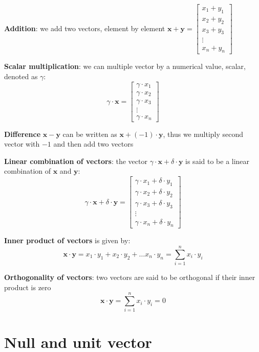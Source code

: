 \documentclass[
]{book}
\theoremstyle{definition}
\theoremstyle{definition}
\theoremstyle{definition}
\theoremstyle{remark}
\begin{document}
\textbf{Addition}: we add two vectors, element by element \(\mathbf{x} + \mathbf{y}=\begin{bmatrix}  x_1 + y_1 \\  x_2 + y_2 \\  x_3 + y_3 \\  \vdots \\  x_n + y_n \end{bmatrix}\)

\textbf{Scalar multiplication}: we can multiple vector by a numerical value, scalar, denoted as \(\gamma\):
\[\gamma \cdot \mathbf{x} =\begin{bmatrix}
  \gamma \cdot x_1 \\ 
  \gamma \cdot x_2 \\
  \gamma \cdot x_3 \\
  \vdots \\
  \gamma \cdot x_n 
\end{bmatrix}\]

\textbf{Difference} \(\mathbf{x} - \mathbf{y}\) can be written as \(\mathbf{x} + (-1) \cdot \mathbf{y}\), thus we multiply second vector with \(-1\) and then add two vectors

\textbf{Linear combination of vectors}: the vector \(\gamma \cdot \mathbf{x} + \delta \cdot \mathbf{y}\) is said to be a linear combination of \(\mathbf{x}\) and \(\mathbf{y}\):
\[\gamma \cdot \mathbf{x} + \delta \cdot \mathbf{y} =\begin{bmatrix}
  \gamma \cdot x_1 + \delta \cdot y_1 \\ 
  \gamma \cdot x_2 + \delta \cdot y_2\\
  \gamma \cdot x_3 + \delta \cdot y_3\\
  \vdots \\
  \gamma \cdot x_n + \delta \cdot y_n
\end{bmatrix}\]

\textbf{Inner product of vectors} is given by: \[\mathbf{x} \cdot \mathbf{y} = x_1 \cdot y_1 + x_2 \cdot y_2 + \dots x_n \cdot y_n = \displaystyle\sum_{i=1}^{n}x_i\cdot y_i\]

\textbf{Orthogonality of vectors}: two vectors are said to be orthogonal if their inner product is zero \[\mathbf{x} \cdot \mathbf{y} =\displaystyle\sum_{i=1}^{n}x_i\cdot y_i = 0\]

\hypertarget{null-and-unit-vector}{%
\section{Null and unit vector}\label{null-and-unit-vector}}
\end{document}

